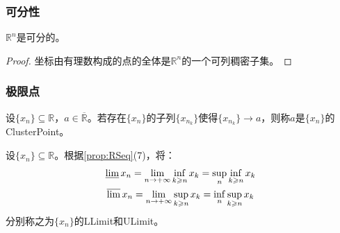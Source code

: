 \subsubsection{可分性}
\begin{theorem}
	$\mathbb{R}^{n}$是可分的。
\end{theorem}
\begin{proof}
	坐标由有理数构成的点的全体是$\mathbb{R}^{n}$的一个可列稠密子集。
\end{proof}

\subsubsection{极限点}
\begin{definition}
	设$\{x_n\}\subseteq\mathbb{R}$，$a\in\overline{\mathbb{R}}$。若存在$\{x_n\}$的子列$\{x_{n_k}\}$使得$\{x_{n_k}\}\to a$，则称$a$是$\{x_n\}$的\gls{ClusterPoint}。
\end{definition}
\begin{definition}
	设$\{x_n\}\subseteq\mathbb{R}$。根据\cref{prop:RSeq}(7)，将：
	\begin{gather*}
		\varliminf x_n=\lim_{n\to+\infty}\inf_{k\geqslant n}x_k=\sup_n\inf_{k\geqslant n}x_k \\
		\varlimsup x_n=\lim_{n\to+\infty}\sup_{k\geqslant n}x_k=\inf_n\sup_{k\geqslant n}x_k
	\end{gather*}
	分别称之为$\{x_n\}$的\gls{LLimit}和\gls{ULimit}。
\end{definition}

